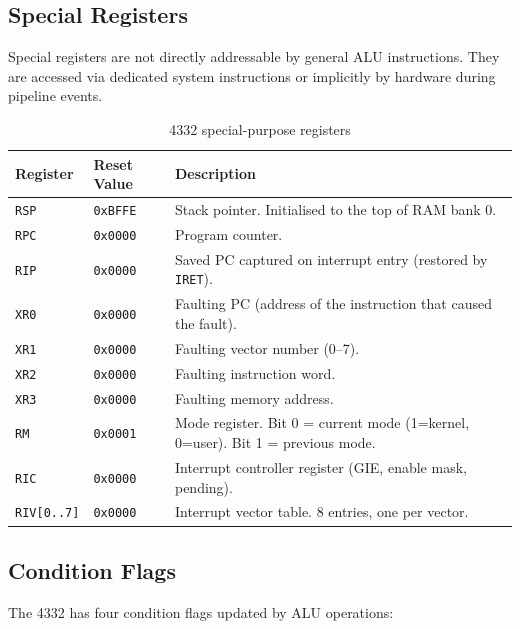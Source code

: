 \documentclass[a4paper,12pt]{report}
\newcommand{\asm}[1]{\texttt{#1}}
\begin{document}
\subsection{Special Registers}

Special registers are not directly addressable by general ALU instructions. They are accessed via dedicated system instructions or implicitly by hardware during pipeline events.

\begin{table}[htbp]
\centering
\caption{4332 special-purpose registers}
\label{tab:spr}
\begin{tabularx}{\textwidth}{llX}
    \toprule
    \textbf{Register} & \textbf{Reset Value} & \textbf{Description} \\
    \midrule
    \asm{RSP} & \texttt{0xBFFE} & Stack pointer. Initialised to the top of RAM bank 0. \\
    \asm{RPC} & \texttt{0x0000} & Program counter. \\
    \asm{RIP} & \texttt{0x0000} & Saved PC captured on interrupt entry (restored by \asm{IRET}). \\
    \asm{XR0} & \texttt{0x0000} & Faulting PC (address of the instruction that caused the fault). \\
    \asm{XR1} & \texttt{0x0000} & Faulting vector number (0--7). \\
    \asm{XR2} & \texttt{0x0000} & Faulting instruction word. \\
    \asm{XR3} & \texttt{0x0000} & Faulting memory address. \\
    \asm{RM}  & \texttt{0x0001} & Mode register. Bit 0 = current mode (1=kernel, 0=user). Bit 1 = previous mode. \\
    \asm{RIC} & \texttt{0x0000} & Interrupt controller register (GIE, enable mask, pending). \\
    \asm{RIV[0..7]} & \texttt{0x0000} & Interrupt vector table. 8 entries, one per vector. \\
    \bottomrule
\end{tabularx}
\end{table}

\subsection{Condition Flags}

The 4332 has four condition flags updated by ALU operations:
\end{document}
